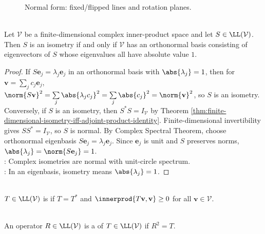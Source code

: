 \begin{figure}[H]
  \centering
  
  \caption{Normal form: fixed/flipped lines and rotation planes.}
  \label{fig:real-isometry-blocks}
\end{figure}

\begin{theorem} \label{thm:complex-isometry-description} \\
Let $\mathcal{V}$ be a finite-dimensional complex inner-product space and let $S\in\LL(\mathcal{V})$. Then $S$ is an isometry if and only if $\mathcal{V}$ has an orthonormal basis consisting of eigenvectors of $S$ whose eigenvalues all have absolute value $1$.
\begin{proof}
If $S\mathbf{e}_j=\lambda_j\mathbf{e}_j$ in an orthonormal basis with $\abs{\lambda_j}=1$, then for $\mathbf{v}=\sum_j c_j\mathbf{e}_j$,\\
$\norm{S\mathbf{v}}^2=\sum\limits_j\abs{\lambda_jc_j}^2=\sum\limits_j\abs{c_j}^2=\norm{\mathbf{v}}^2$, so $S$ is an isometry. Conversely, if $S$ is an isometry, then $S^*S=I_{\mathcal{V}}$ by Theorem \ref{thm:finite-dimensional-isometry-iff-adjoint-product-identity}. Finite-dimensional invertibility gives $SS^*=I_{\mathcal{V}}$, so $S$ is normal. By Complex Spectral Theorem, choose orthonormal eigenbasis $S\mathbf{e}_j=\lambda_j\mathbf{e}_j$. Since $\mathbf{e}_j$ is unit and $S$ preserves norms, $\abs{\lambda_j}=\norm{S\mathbf{e}_j}=1$.\\
: Complex isometries are normal with unit-circle spectrum.\\
: In an eigenbasis, isometry means $\abs{\lambda_j}=1$.
\end{proof}
\end{theorem}

\begin{definition} \label{def:positive-operator} \\
$T\in\LL(\mathcal{V})$ is  if $T=T^*$ and $\innerprod{T\mathbf{v},\mathbf{v}}\geq0$ for all $\mathbf{v}\in\mathcal{V}$.
\end{definition}

\begin{definition} \label{def:square-root-operator} \\
An operator $R\in\LL(\mathcal{V})$ is a  of $T\in\LL(\mathcal{V})$ if $R^2=T$.
\end{definition}

